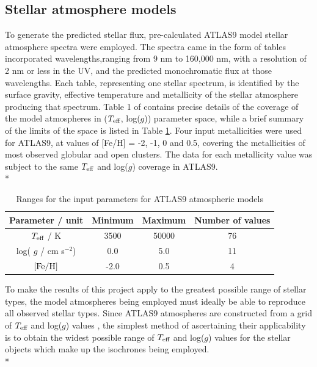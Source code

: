 \documentclass[12pt, a4paper]{report}
\begin{document}
\subsection{Stellar atmosphere models}
To generate the predicted stellar flux, pre-calculated ATLAS9 model stellar atmosphere spectra \citep{1993KurCD..13.....K} were employed. The spectra came in the form of tables incorporated wavelengths,ranging from 9 nm to 160,000 nm, with a resolution of 2 nm or less in the UV, and the predicted monochromatic flux at those wavelengths. Each table, representing one stellar spectrum, is identified by the surface gravity, effective temperature and metallicity of the stellar atmosphere producing that spectrum. Table 1 of \cite{2004astro.ph..5087C} contains precise details of the coverage of the model atmospheres in ($T_{\textnormal{eff}}$, log($g$)) parameter space, while a brief summary  of the limits of the space is listed in Table \ref{atlas9_input}. Four input metallicities were used for ATLAS9, at values of [Fe/H] = -2, -1, 0 and 0.5, covering the metallicities of most observed globular and open clusters. The data for each metallicity value was subject to the same $T_{\textnormal{eff}}$ and log($g$) coverage in ATLAS9.\\*

\begin{table}
\begin{center}
\begin{tabular}{cccc}
\hline
Parameter / unit & Minimum & Maximum & Number of values \\
\hline
$T_{\textnormal{eff}}$ / K & 3500 & 50000 & 76 \\
log( $g$ / cm s$^{-2}$) & 0.0 & 5.0 & 11 \\
$\textnormal{[Fe/H]}$ & -2.0 & 0.5 & 4 \\
\hline
\end{tabular}
\caption{Ranges for the input parameters for ATLAS9 atmospheric models}
\label{atlas9_input}
\end{center}
\end{table}

To make the results of this project apply to the greatest possible range of stellar types, the model atmospheres being employed must ideally be able to reproduce all observed stellar types. Since ATLAS9 atmospheres are constructed from a grid of $T_{\textnormal{eff}}$ and log($g$) values \citep{2004astro.ph..5087C}, the simplest method of ascertaining their applicability is to obtain the widest possible range of $T_{\textnormal{eff}}$ and log($g$) values for the stellar objects which make up the isochrones being employed.\\*
\end{document}
